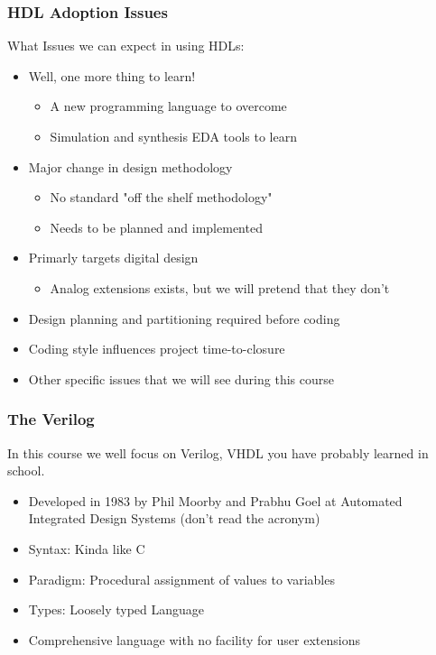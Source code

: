 \documentclass[t]{beamer}
\begin{document}
\begin{frame}
\frametitle{HDL Adoption Issues}

What Issues we can expect in using HDLs:
\begin{itemize}
\item Well, one more thing to learn!
\begin{itemize}
	\item A new programming language to overcome
	\item Simulation and synthesis EDA tools to learn
\end{itemize}
\item Major change in design methodology
\begin{itemize}
	\item No standard "off the shelf methodology"
	\item Needs to be planned and implemented
\end{itemize}
\item Primarly targets digital design
\begin{itemize}
	\item Analog extensions exists, but we will pretend that they don't
\end{itemize}
\item Design planning and partitioning required before coding
\item Coding style influences project time-to-closure
\item Other specific issues that we will see during this course
\end{itemize}
\end{frame}

\begin{frame}
\frametitle{The Verilog}

In this course we well focus on Verilog, VHDL you have probably learned in school.
\newline

\begin{itemize}
\item Developed in 1983 by Phil Moorby and Prabhu Goel at Automated Integrated Design Systems (don't read the acronym)
\item Syntax: Kinda like C
\item Paradigm: Procedural assignment of values to variables
\item Types: Loosely typed Language
\item Comprehensive language with no facility for user extensions
\end{itemize}
\end{frame}
\end{document}
